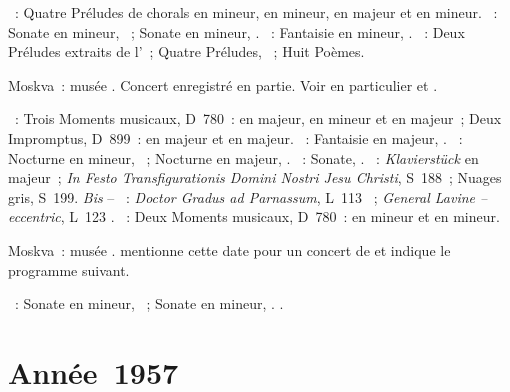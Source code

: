 \begin{description}
 \textsc{\JBach{}}~: Quatre Préludes de chorals en \kG mineur, en \kE \Flat
 mineur, en majeur et en \kF mineur.
 \textsc{\Beethoven{}}~: Sonate en \kC \Sharp mineur,  ~;
 Sonate en \kF mineur, .
 \textsc{\Chopin{}}~: Fantaisie en \kF mineur, .
 \textsc{\Scriabine{}}~: Deux Préludes extraits de l'~; Quatre
 Préludes, ~; Huit Poèmes.
 \item[\DateWithWeekDay{1956-12-25}]
 Moskva~: musée \Scriabine{}.
 Concert enregistré en partie.
 Voir en particulier \citet[p.~450]{Milshteyn82a} et
 \citet[p.~395]{Shiryaeva}.

 \textsc{\Schubert{}}~: Trois Moments musicaux, D~780~:  en \kA
 \Flat majeur,  en \kF mineur et  en \kA \Flat majeur~;
 Deux Impromptus, D~899~:  en \kE \Flat majeur et  en
 \kA \Flat majeur.
 \textsc{\Schumann{}}~: Fantaisie en \kC majeur, .
 \textsc{\Chopin{}}~: Nocturne en \kC mineur,  ~;
 Nocturne en \kF majeur,  .
 \textsc{\Scriabine{}}~: Sonate, .
 \textsc{\Liszt{}}~: \emph{Klavierstück} en \kF \Sharp majeur~; \emph{In
 Festo Transfigurationis Domini Nostri Jesu Christi}, S~188~; Nuages gris,
 S~199.
 \emph{Bis} -- \textsc{\Debussy{}}~: \emph{Doctor Gradus ad Parnassum},
 L~113 ~; \emph{General Lavine -- eccentric}, L~123 .
 \textsc{\Schubert{}}~: Deux Moments musicaux, D~780~:  en \kF
 mineur et  en \kF mineur.
 \item[\DateWithWeekDay{1956-12-30}]
 Moskva~: musée \Scriabine{}.
 \citet[p.~179]{Nekrasova08} mentionne cette date pour un concert de
 \VSofronitsky{} et indique le programme suivant.

 \textsc{\Beethoven{}}~: Sonate en \kC \Sharp mineur,  ~;
 Sonate en \kC mineur, .
 \textsc{\Liszt{}}.
\end{description}

\section{Année~1957}

